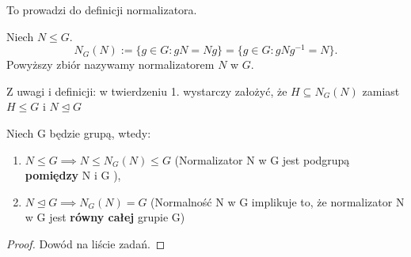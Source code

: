 To prowadzi do definicji normalizatora.

\begin{definition}[Normalizator N w G]

	Niech $N\le G$.
	\[
	N_{G}(N):= \{g\in G: gN = Ng\} = \{g\in G: gNg^{-1}=N\} 
	.\] 
	Powyższy zbiór nazywamy normalizatorem $N$ w $G$.
\end{definition}

Z uwagi i definicji: w twierdzeniu 1. wystarczy założyć, że $H\subseteq N_{G}(N)$ zamiast $H\le G$ i $N\unlhd G$

\begin{fact}

	Niech G będzie grupą, wtedy:
	\begin{enumerate}[label=\alph*)]
		\item $N\le G \implies N\le N_{G}(N)\le G$ (Normalizator N w G jest podgrupą \textbf{pomiędzy} N i G ),
		\item $N\unlhd G \implies N_{G}(N) = G$ (Normalność N w G implikuje to, że  normalizator N w G jest \textbf{równy całej} grupie G)
	\end{enumerate}
\end{fact}
\begin{proof}

	Dowód na liście zadań.
\end{proof}

